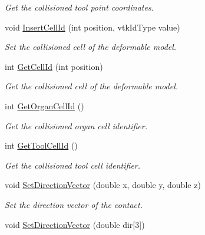 \begin{DoxyCompactItemize}
\begin{DoxyCompactList}\small\item\em Get the collisioned tool point coordinates. \item\end{DoxyCompactList}\item 
void \hyperlink{classvtkContact_a58075df90c9c5fb7fa5972de36898d9a}{InsertCellId} (int position, vtkIdType value)
\begin{DoxyCompactList}\small\item\em Set the collisioned cell of the deformable model. \item\end{DoxyCompactList}\item 
int \hyperlink{classvtkContact_a825566e780e4fca5dc766b3c7c259366}{GetCellId} (int position)
\begin{DoxyCompactList}\small\item\em Get the collisioned cell of the deformable model. \item\end{DoxyCompactList}\item 
\hypertarget{classvtkContact_a3bd009504801ff326fcda89ee2611ef0}{
int \hyperlink{classvtkContact_a3bd009504801ff326fcda89ee2611ef0}{GetOrganCellId} ()}
\label{classvtkContact_a3bd009504801ff326fcda89ee2611ef0}

\begin{DoxyCompactList}\small\item\em Get the collisioned organ cell identifier. \item\end{DoxyCompactList}\item 
\hypertarget{classvtkContact_af4fbfa2af472f77618c55a5bc9f7df0a}{
int \hyperlink{classvtkContact_af4fbfa2af472f77618c55a5bc9f7df0a}{GetToolCellId} ()}
\label{classvtkContact_af4fbfa2af472f77618c55a5bc9f7df0a}

\begin{DoxyCompactList}\small\item\em Get the collisioned tool cell identifier. \item\end{DoxyCompactList}\item 
\hypertarget{classvtkContact_a38bd3bc66db426733a50d2cf2bb756ea}{
void \hyperlink{classvtkContact_a38bd3bc66db426733a50d2cf2bb756ea}{SetDirectionVector} (double x, double y, double z)}
\label{classvtkContact_a38bd3bc66db426733a50d2cf2bb756ea}

\begin{DoxyCompactList}\small\item\em Set the direction vector of the contact. \item\end{DoxyCompactList}\item 
\hypertarget{classvtkContact_a7c3432d881ec3820581f2c5de5236bb0}{
void \hyperlink{classvtkContact_a7c3432d881ec3820581f2c5de5236bb0}{SetDirectionVector} (double dir\mbox{[}3\mbox{]})}
\label{classvtkContact_a7c3432d881ec3820581f2c5de5236bb0}


\end{DoxyCompactItemize}
